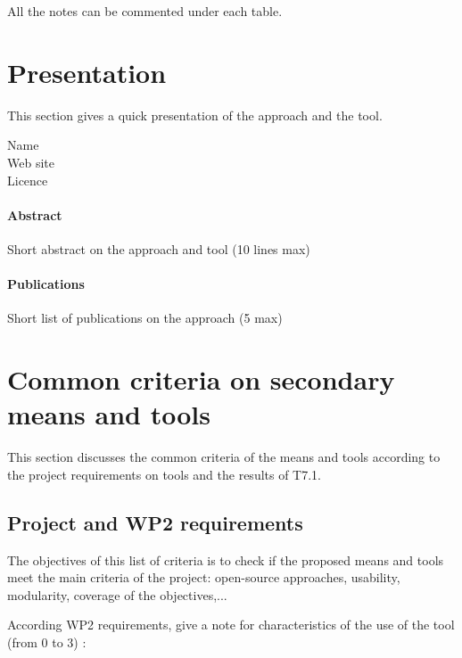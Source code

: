 All the notes can be commented under each table.

\section{Presentation}

This section gives a quick presentation of the approach and the tool.

\begin{description}
\item[Name] 
\item[Web site] 
\item[Licence] 
\end{description}

\paragraph{Abstract} Short abstract on the approach and tool (10 lines max)

\paragraph{Publications} Short list of publications on the approach (5 max)


\section{Common criteria on secondary means and tools}
\label{common}
This section discusses the common criteria of the means and tools according to the project requirements on tools and the results of T7.1.

\subsection{Project and WP2 requirements}

The objectives of this list of criteria is to check if the proposed means and tools meet the main criteria of the project: open-source approaches, usability, modularity, coverage of the objectives,...

According WP2 requirements, give a note for characteristics of the use of the tool (from 0 to 3) :

